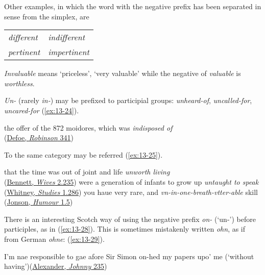 Other examples, in which the word with the negative prefix has been separated in sense from the simplex, are

\bigskip

\begin{tabular}{@{}ll@{}}
 \textit{different} & \textit{indifferent}\\
\textit{pertinent} & \textit{impertinent}
\end{tabular}

\bigskip

\textit{Invaluable} means `priceless', `very valuable' while the negative of \textit{valuable} is \textit{worthless}.

\bigskip
\textit{Un-} (rarely \textit{in-}) may be prefixed to participial groups: \textit{unheard-of}, \textit{uncalled-for}, \textit{uncared-for} (\ref{ex:13-24}).

\ea \label{ex:13-24} the offer of the 872 moidores, which was \emph{indisposed of}\\\hfill(\href{https://archive.org/details/lifeandstranges00dobsgoog/page/n367/mode/2up?q=%22872%22&view=theater}{Defoe, \textit{Robinson} 341}) %
\z

To the same category may be referred (\ref{ex:13-25}).

\ea \label{ex:13-25}
\ea that the time was out of joint and life \emph{unworth living}\\\hfill(\href{https://archive.org/details/cu31924013586940/page/516/mode/2up?q=%22time+was+out+of+joint%22&view=theater}{Bennett, \textit{Wives} 2.235})
\ex were a generation of infants to grow up \emph{untaught to speak}\\\hfill(\href{https://archive.org/details/in.ernet.dli.2015.49512/page/n301/mode/2up?view=theater&q=%22untaught+to+speak%22}{Whitney, \textit{Studies} 1.286})
\ex you haue very rare, and \emph{vn-in-one-breath-vtter-able} skill\\\hfill(\href{https://archive.org/details/cu31924013130723/page/n89/mode/2up?q=%22very+rare%22&view=theater}{Jonson, \textit{Humour} 1.5}) %
\z
\z

There is an interesting Scotch way of using the negative prefix 
\textit{on-} (`un-') before participles, as in (\ref{ex:13-28}). This is sometimes mistakenly written \textit{ohn}, as if from 
German \textit{ohne}: (\ref{ex:13-29}).

\ea \label{ex:13-28}
I'm nae responsible to gae afore Sir Simon on-hed my papers upo' me \phantom{x} (`without having')\hfill(\href{https://archive.org/details/johnnygibbofgush00alex_0/page/234/mode/2up?q=%22nae+responsible%22&view=theater}{Alexander, \textit{Johnny} 235})
\z

